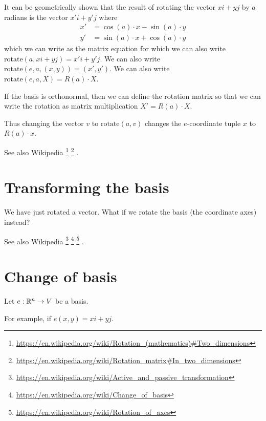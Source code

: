 It can be geometrically shown that
the result of rotating the vector \(xi+yj\) by \(a\) radians
is the vector \(x'i+y'j\) where
\begin{align}
    x' &= \cos(a) \cdot x - \sin(a) \cdot y
    \\ y' &= \sin(a) \cdot x + \cos(a) \cdot y
\end{align}
which we can write as the matrix equation
for which we can also write \( \text{rotate}(a, xi + yj) = x'i + y'j \).
We can also write \( \text{rotate}(e, a, (x,y)) = (x',y')\).
We can also write \( \text{rotate}(e, a, X) = R(a) \cdot X\).

If the basis is orthonormal, then we can define the rotation matrix
so that we can write the rotation as matrix multiplication
\( X' = R(a) \cdot X \).

Thus changing the vector \(v\) to \(\text{rotate}(a,v)\)
changes the \(e\)-coordinate tuple \(x\) to \(R(a) \cdot x\).

See also Wikipedia%
\footnote{\url{https://en.wikipedia.org/wiki/Rotation_(mathematics)\#Two_dimensions}}%
\footnote{\url{https://en.wikipedia.org/wiki/Rotation_matrix\#In_two_dimensions}}%
.

\section{Transforming the basis}

We have just rotated a vector.
What if we rotate the basis (the coordinate axes) instead?

See also Wikipedia%
\footnote{\url{https://en.wikipedia.org/wiki/Active_and_passive_transformation}}%
\footnote{\url{https://en.wikipedia.org/wiki/Change_of_basis}}%
\footnote{\url{https://en.wikipedia.org/wiki/Rotation_of_axes}}%
.

\section{Change of basis}

Let \( e : \mathbb{R}^n \to V \) be a basis.

For example, if \(e(x,y) = xi + yj\).

